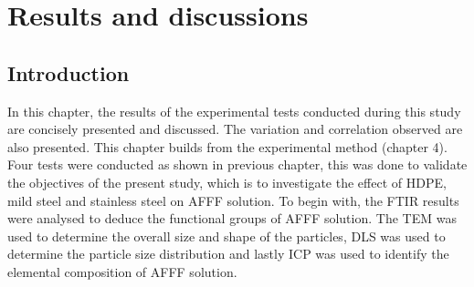 \documentclass[12pt]{report}
\begin{document}
\chapter{Results and discussions}
\section{Introduction}
In this chapter, the results of the experimental tests conducted during this study are concisely presented and discussed. The variation and correlation observed are also presented. This chapter builds from the experimental method (chapter 4).  Four tests were conducted as shown in previous chapter, this was done to validate the objectives of the present study, which is to investigate the effect of HDPE, mild steel and stainless steel on AFFF solution. 
To begin with, the FTIR results were analysed to deduce the functional groups of AFFF solution. The TEM was used to determine the overall size and shape of the particles, DLS was used to determine the particle size distribution and lastly ICP was used to identify the elemental composition of AFFF solution.  
\end{document}
